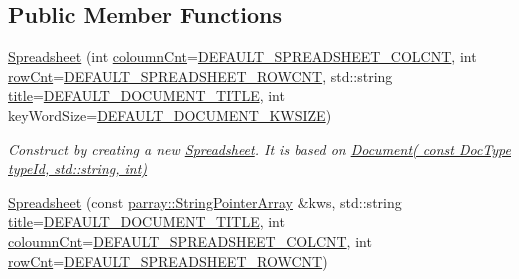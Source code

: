\subsection*{Public Member Functions}
\begin{DoxyCompactItemize}
\item 
\hypertarget{classdocs_1_1Spreadsheet_ac6e95d685e342630144afaad04c99c74}{\hyperlink{classdocs_1_1Spreadsheet_ac6e95d685e342630144afaad04c99c74}{Spreadsheet} (int \hyperlink{classdocs_1_1Spreadsheet_a8193931da11e83c62b3aa1c2177e9e33}{coloumn\-Cnt}=\hyperlink{namespacedocs_aa40437dd2d0305c57f338406303a3f58}{D\-E\-F\-A\-U\-L\-T\-\_\-\-S\-P\-R\-E\-A\-D\-S\-H\-E\-E\-T\-\_\-\-C\-O\-L\-C\-N\-T}, int \hyperlink{classdocs_1_1Spreadsheet_a69756007b1fbe6b45d2f052af930d748}{row\-Cnt}=\hyperlink{namespacedocs_a7562daac15433871b1cc71ad74555032}{D\-E\-F\-A\-U\-L\-T\-\_\-\-S\-P\-R\-E\-A\-D\-S\-H\-E\-E\-T\-\_\-\-R\-O\-W\-C\-N\-T}, std\-::string \hyperlink{classdocs_1_1Document_a419e4470c20e1bddd60448ba430f4738}{title}=\hyperlink{namespacedocs_a4cf6dd6732c7e7ab7f7855e440485d89}{D\-E\-F\-A\-U\-L\-T\-\_\-\-D\-O\-C\-U\-M\-E\-N\-T\-\_\-\-T\-I\-T\-L\-E}, int key\-Word\-Size=\hyperlink{namespacedocs_ae635b9481a61628036b5a97625856475}{D\-E\-F\-A\-U\-L\-T\-\_\-\-D\-O\-C\-U\-M\-E\-N\-T\-\_\-\-K\-W\-S\-I\-Z\-E})}\label{classdocs_1_1Spreadsheet_ac6e95d685e342630144afaad04c99c74}

\begin{DoxyCompactList}\small\item\em Construct by creating a new \hyperlink{classdocs_1_1Spreadsheet}{Spreadsheet}. It is based on \hyperlink{classdocs_1_1Document_a9f0b2c4c1a3e3344f374330399969e90}{Document( const Doc\-Type type\-Id, std\-::string, int)} \end{DoxyCompactList}\item 
\hypertarget{classdocs_1_1Spreadsheet_a6dae1de9618f2e4226fde62477858e05}{\hyperlink{classdocs_1_1Spreadsheet_a6dae1de9618f2e4226fde62477858e05}{Spreadsheet} (const \hyperlink{classparray_1_1StringPointerArray}{parray\-::\-String\-Pointer\-Array} \&kws, std\-::string \hyperlink{classdocs_1_1Document_a419e4470c20e1bddd60448ba430f4738}{title}=\hyperlink{namespacedocs_a4cf6dd6732c7e7ab7f7855e440485d89}{D\-E\-F\-A\-U\-L\-T\-\_\-\-D\-O\-C\-U\-M\-E\-N\-T\-\_\-\-T\-I\-T\-L\-E}, int \hyperlink{classdocs_1_1Spreadsheet_a8193931da11e83c62b3aa1c2177e9e33}{coloumn\-Cnt}=\hyperlink{namespacedocs_aa40437dd2d0305c57f338406303a3f58}{D\-E\-F\-A\-U\-L\-T\-\_\-\-S\-P\-R\-E\-A\-D\-S\-H\-E\-E\-T\-\_\-\-C\-O\-L\-C\-N\-T}, int \hyperlink{classdocs_1_1Spreadsheet_a69756007b1fbe6b45d2f052af930d748}{row\-Cnt}=\hyperlink{namespacedocs_a7562daac15433871b1cc71ad74555032}{D\-E\-F\-A\-U\-L\-T\-\_\-\-S\-P\-R\-E\-A\-D\-S\-H\-E\-E\-T\-\_\-\-R\-O\-W\-C\-N\-T})}\label{classdocs_1_1Spreadsheet_a6dae1de9618f2e4226fde62477858e05}


\end{DoxyCompactItemize}

